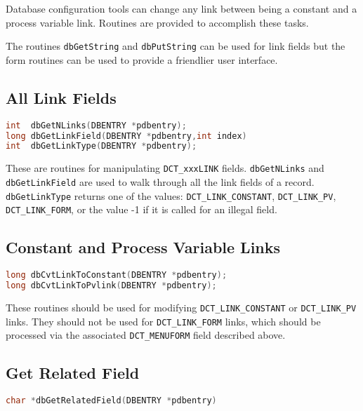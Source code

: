 Database configuration tools can change any link between being a constant and a process variable link.
Routines are provided to accomplish these tasks.

The routines \verb|dbGetString| and \verb|dbPutString| can be used for link fields but the form routines can be used to provide a friendlier user interface.

\subsection{All Link Fields}

\begin{lstlisting}[language=C]
int  dbGetNLinks(DBENTRY *pdbentry);
long dbGetLinkField(DBENTRY *pdbentry,int index)
int  dbGetLinkType(DBENTRY *pdbentry);
\end{lstlisting}

These are routines for manipulating \verb|DCT_xxxLINK| fields. \verb|dbGetNLinks| and \verb|dbGetLinkField| are used to walk 
through all the link fields of a record. \verb|dbGetLinkType| returns one of the values: \verb|DCT_LINK_CONSTANT|, 
\verb|DCT_LINK_PV|, \verb|DCT_LINK_FORM|, or the value -1 if it is called for an illegal field.

\subsection{Constant and Process Variable Links}

\begin{lstlisting}[language=C]
long dbCvtLinkToConstant(DBENTRY *pdbentry);
long dbCvtLinkToPvlink(DBENTRY *pdbentry);
\end{lstlisting}

These routines should be used for modifying \verb|DCT_LINK_CONSTANT| or \verb|DCT_LINK_PV| links. They should not be used 
for \verb|DCT_LINK_FORM| links, which should be processed via the associated \verb|DCT_MENUFORM| field described above.

\subsection{Get Related Field}

\begin{lstlisting}[language=C]
char *dbGetRelatedField(DBENTRY *pdbentry)
\end{lstlisting}

